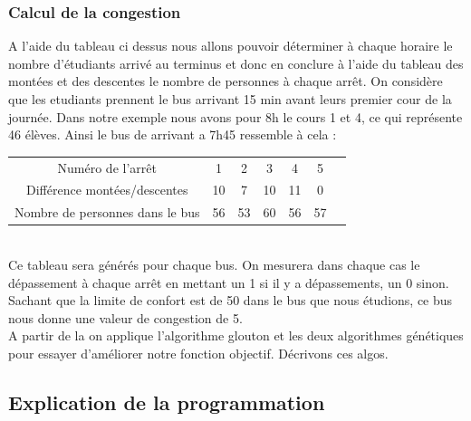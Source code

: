 \documentclass[a4paper,11pt]{article}
\begin{document}
		\subsubsection{Calcul de la congestion}
			A l'aide du tableau ci dessus nous allons pouvoir déterminer à chaque horaire le nombre d'étudiants arrivé au terminus et donc en conclure à l'aide du tableau des montées et des descentes le nombre de personnes à chaque arrêt. 
			On considère que les etudiants prennent le bus arrivant 15 min avant leurs premier cour de la journée.
			Dans notre exemple nous avons pour  8h le cours 1 et 4, ce qui représente 46 élèves. Ainsi le bus de arrivant a 7h45 ressemble à cela :  \\
			\begin{tabular}{ | c | c | c | c | c | c | c |}
 				\hline			
   				Numéro de l'arrêt & 1 & 2 & 3 & 4 & 5\\
   				Différence montées/descentes & 10 & 7 & 10 & 11 & 0\\
   				Nombre de personnes dans le bus & 56 & 53 & 60 & 56 & 57\\
 				\hline  
 			\end{tabular}\\
 			Ce tableau sera générés pour chaque bus. On mesurera dans chaque cas le dépassement à chaque arrêt en mettant un 1 si il y a dépassements, un 0 sinon.
 			Sachant que la limite de confort est de 50 dans le bus que nous étudions, ce bus nous donne une valeur de congestion de 5.\\
 			A partir de la on applique l'algorithme glouton et les deux algorithmes génétiques pour essayer d'améliorer notre fonction objectif.
 			Décrivons ces algos.

	\subsection{Explication de la programmation}
\end{document}
